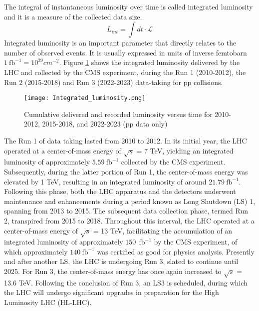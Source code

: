 The integral of instantaneous luminosity over time is called integrated luminosity and it is a measure of the collected data size.
\begin{equation}
    L_{int} = \int dt \cdot \mathcal{L}
\end{equation}
Integrated luminosity is an important parameter that directly relates to the number of observed events. It is usually expressed in units of inverse femtobarn $ 1 \: \text{fb}^{-1} = 10^{39} cm^{-2} $. Figure \ref{fig:Lumi} shows the integrated luminosity delivered by the LHC and collected by the CMS experiment, during the Run 1 (2010-2012), the Run 2 (2015-2018) and Run 3 (2022-2023) data-taking for pp collisions.
\begin{figure}[htb!]
    \centering
    \texttt{[image: Integrated\_luminosity.png]}
    \caption{Cumulative delivered and recorded luminosity versus time for 2010-2012, 2015-2018, and 2022-2023 (pp data only) \cite{IntLum}}
    \label{fig:Lumi}
\end{figure}
The Run 1 of data taking lasted from 2010 to 2012. In its initial year, the LHC operated at a center-of-mass energy of $\sqrt{s}$ = 7 TeV, yielding an integrated luminosity of approximately $5.59 \: \text{fb}^{-1}$ collected by the CMS experiment. Subsequently, during the latter portion of Run 1, the  center-of-mass energy was elevated by 1 TeV, resulting in an integrated luminosity of around $21.79 \: \text{fb}^{-1}$. Following this phase, both the LHC apparatus and the detectors underwent maintenance and enhancements during a period known as Long Shutdown (LS) 1, spanning from 2013 to 2015. The subsequent data collection phase, termed Run 2, transpired from 2015 to 2018. Throughout this interval, the LHC operated at a  center-of-mass energy of $\sqrt{s}$ = 13 TeV, facilitating the accumulation of an integrated luminosity of approximately $150 \: \: \text{fb}^{-1}$ by the CMS experiment, of which approximately $140 \: \text{fb}^{-1}$ was certified as good for physics analysis. Presently and after another LS, the LHC is undergoing Run 3, slated to continue until 2025. For Run 3, the center-of-mass energy has once again increased to $\sqrt{s}$ = 13.6 TeV. Following the conclusion of Run 3, an LS3 is scheduled, during which the LHC will undergo significant upgrades in preparation for the High Luminosity LHC (HL-LHC).
